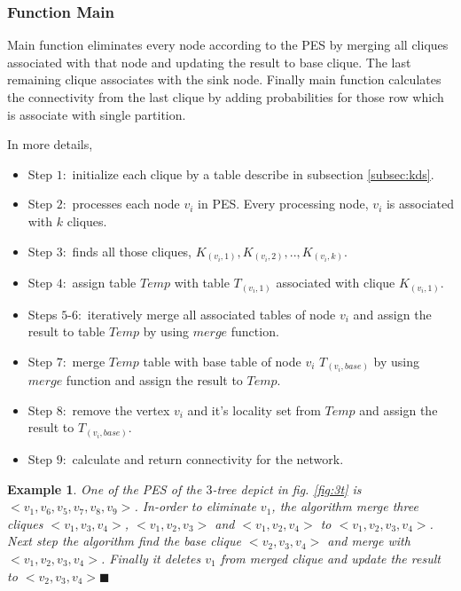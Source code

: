 \documentclass[11pt]{article}
\newtheorem{exmp}{Example}[section]
\begin{document}
\subsubsection{Function Main}
Main function eliminates every node according to the PES by merging all cliques associated with that node and updating the result to base clique. The last remaining clique associates with the sink node. Finally  main function calculates the connectivity from the last clique by adding probabilities for those row which is associate with single partition.

In more details, 
\begin{itemize}[noitemsep,nolistsep]
\item   Step $1:$ initialize each clique by a table describe in subsection \ref{subsec:kds}.
\item Step $2:$ processes each node $v_i$ in PES. Every processing node, $v_i$ is associated with $k$ cliques.
\item Step $3:$ finds all those cliques,
 $K_{(v_i,1)},K_{(v_i,2)},..,K_{(v_i,k)}$. 
 \item Step $4:$ assign table $Temp$ with table  $T_{(v_i,1)}$ associated with clique  $K_{(v_i,1)}$.
 \item Steps $5$-$6:$ iteratively merge all associated tables of node $v_i$ and assign the result to table $Temp$ by using $merge$ function. \item Step $7:$ merge $Temp$ table with base table of node $v_i$ $T_{(v_i,base)}$ by using $merge$ function and assign the result to $Temp$. 
 \item Step $8:$ remove the vertex $v_i$ and it's locality set from $Temp$ and assign the result to $T_{(v_i,base)}$.
 \item Step $9:$ calculate and return connectivity for the network.
 \end{itemize}
\begin{exmp}
\normalfont
 One of the PES of the $3$-tree depict in fig. \ref{fig:3t} is $<v_1,v_6,v_5,v_7,v_8, v_9>$. In-order to eliminate $v_1$, the algorithm  merge three cliques $<v_1,v_3,v_4>$, $<v_1,v_2,v_3>$ and $<v_1,v_2,v_4>$ to $<v_1,v_2,v_3,v_4>$. Next step the algorithm find the base clique $<v_2,v_3,v_4>$ and merge with  $<v_1,v_2,v_3,v_4>$. Finally it deletes $v_1$  from merged clique and update the result to $<v_2,v_3,v_4> \blacksquare$
\end{exmp}
\end{document}
